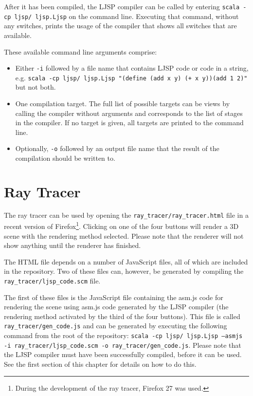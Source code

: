 \documentclass[11pt]{report}
\begin{document}
After it has been compiled, the LJSP compiler can be called by entering \texttt{scala -cp ljsp/ ljsp.Ljsp} on the command line. Executing that command, without any switches, prints the usage of the compiler that shows all switches that are available.

These available command line arguments comprise:
\begin{itemize}
\item Either \texttt{-i} followed by a file name that contains LJSP code or code in a string, e.g. \texttt{scala -cp ljsp/ ljsp.Ljsp "(define (add x y) (+ x y))(add 1 2)"} but not both.
\item One compilation target. The full list of possible targets can be views by calling the compiler without arguments and corresponds to the list of stages in the compiler. If no target is given, all targets are printed to the command line.
\item Optionally, \texttt{-o} followed by an output file name that the result of the compilation should be written to.
\end{itemize}

\section{Ray Tracer}

The ray tracer can be used by opening the \texttt{ray_tracer/ray_tracer.html} file in a recent version of Firefox\footnote{During the development of the ray tracer, Firefox 27 was used.}. Clicking on one of the four buttons will render a 3D scene with the rendering method selected. Please note that the renderer will not show anything until the renderer has finished. 

The HTML file depends on a number of JavaScript files, all of which are included in the repository. Two of these files can, however, be generated by compiling the \texttt{ray_tracer/ljsp_code.scm} file.

The first of these files is the JavaScript file containing the asm.js code for rendering the scene using asm.js code generated by the LJSP compiler (the rendering method activated by the third of the four buttons). This file is called \texttt{ray_tracer/gen_code.js} and can be generated by executing the following command from the root of the repository: \texttt{scala -cp ljsp/ ljsp.Ljsp --asmjs -i ray_tracer/ljsp_code.scm -o ray_tracer/gen_code.js}. Please note that the LJSP compiler must have been successfully compiled, before it can be used. See the first section of this chapter for details on how to do this.
\end{document}
